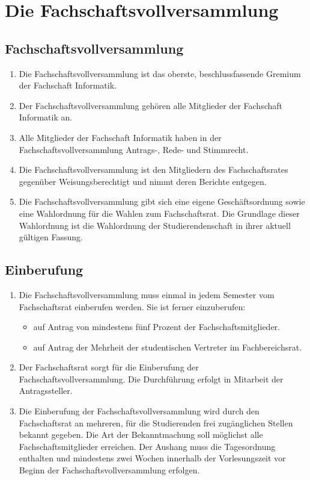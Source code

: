 \section {Die Fachschaftsvollversammlung}

\subsection{Fachschaftsvollversammlung}
\begin{enumerate}
\item Die Fachschaftsvollversammlung ist das oberste, beschlussfassende Gremium der Fachschaft Informatik.
\item Der Fachschaftsvollversammlung gehören alle Mitglieder der Fachschaft Informatik an.
\item Alle Mitglieder der Fachschaft Informatik haben in der Fachschaftsvollversammlung Antrags-, Rede- und Stimmrecht.
\item Die Fachschaftsvollversammlung ist den Mitgliedern des Fachschaftsrates gegenüber Weisungsberechtigt und nimmt deren Berichte entgegen.
\item Die Fachschaftsvollversammlung gibt sich eine eigene Geschäftsordnung sowie eine Wahlordnung für die Wahlen zum Fachschaftsrat. Die Grundlage dieser Wahlordnung ist die Wahlordnung der Studierendenschaft in ihrer aktuell gültigen Fassung.
\end{enumerate}

\subsection{Einberufung}
\begin{enumerate}
\item Die Fachschaftsvollversammlung muss einmal in jedem Semester vom Fachschaftsrat einberufen werden. Sie ist ferner einzuberufen:
\begin{itemize}
\item auf Antrag von mindestens fünf Prozent der Fachschaftsmitglieder.
\item auf Antrag der Mehrheit der studentischen Vertreter im Fachbereichsrat.
\end{itemize}
\item Der Fachschaftsrat sorgt für die Einberufung der Fachschaftsvollversammlung. Die Durchführung erfolgt in Mitarbeit der Antragssteller.
\item Die Einberufung der Fachschaftsvollversammlung wird durch den Fachschaftsrat an mehreren, für die Studierenden frei zugänglichen Stellen bekannt gegeben. Die Art der Bekanntmachung soll möglichst alle Fachschaftsmitglieder erreichen. Der Aushang muss die Tagesordnung enthalten und mindestens zwei Wochen innerhalb der Vorlesungszeit vor Beginn der Fachschaftsvollversammlung erfolgen.
\end{enumerate}

